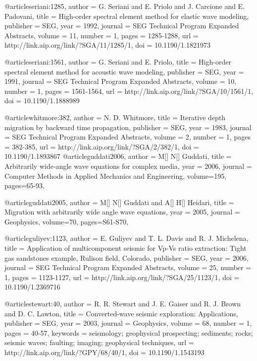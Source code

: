 @article{seriani:1285,
  author =	 {G. Seriani and E. Priolo and J. Carcione and
                  E. Padovani},
  title =	 {High-order spectral element method for elastic wave
                  modeling},
  publisher =	 {SEG},
  year =	 1992,
  journal =	 {SEG Technical Program Expanded Abstracts},
  volume =	 11,
  number =	 1,
  pages =	 {1285-1288},
  url =		 {http://link.aip.org/link/?SGA/11/1285/1},
  doi =		 {10.1190/1.1821973}
}

@article{seriani:1561,
  author =	 {G. Seriani and E. Priolo},
  title =	 {High-order spectral element method for acoustic wave
                  modeling},
  publisher =	 {SEG},
  year =	 1991,
  journal =	 {SEG Technical Program Expanded Abstracts},
  volume =	 10,
  number =	 1,
  pages =	 {1561-1564},
  url =		 {http://link.aip.org/link/?SGA/10/1561/1},
  doi =		 {10.1190/1.1888989}
}

@article{whitmore:382,
  author =	 {N. D. Whitmore},
  title =	 {Iterative depth migration by backward time
                  propagation},
  publisher =	 {SEG},
  year =	 1983,
  journal =	 {SEG Technical Program Expanded Abstracts},
  volume =	 2,
  number =	 1,
  pages =	 {382-385},
  url =		 {http://link.aip.org/link/?SGA/2/382/1},
  doi =		 {10.1190/1.1893867}
}
@article{guddati2006,
  author =	 {M[] N[] Guddati},
  title =	 {Arbitrarily wide-angle wave equations for complex media},
  year =	 2006,
  journal =	 {Computer Methods in Applied Mechanics and Engineering},
  volume={195},
 pages=65-93,
}

@article{guddati2005,
  author =	 {M[] N[] Guddati and A[] H[] Heidari},
  title =	 {Migration with arbitrarily wide angle wave equations},
  year =	 2005,
  journal =	 {Geophysics},
  volume={70},
 pages=S61-S70,
}

@article{guliyev:1123,
  author =	 {E. Guliyev and T. L. Davis and R.
                  J. Michelena},
  title =	 {Application of multicomponent seismic for Vp-Vs
                  ratio extraction: Tight gas sandstones example,
                  Rulison field, Colorado},
  publisher =	 {SEG},
  year =	 2006,
  journal =	 {SEG Technical Program Expanded Abstracts},
  volume =	 25,
  number =	 1,
  pages =	 {1123-1127},
  url =		 {http://link.aip.org/link/?SGA/25/1123/1},
  doi =		 {10.1190/1.2369716}
}

@article{stewart:40,
  author =	 {R. R. Stewart and J. E. Gaiser and R. J.
                  Brown and D. C. Lawton},
  title =	 {Converted-wave seismic exploration: Applications},
  publisher =	 {SEG},
  year =	 2003,
  journal =	 {Geophysics},
  volume =	 68,
  number =	 1,
  pages =	 {40-57},
  keywords =	 {seismology; geophysical prospecting; sediments;
                  rocks; seismic waves; faulting; imaging; geophysical
                  techniques},
  url =		 {http://link.aip.org/link/?GPY/68/40/1},
  doi =		 {10.1190/1.1543193}
}

